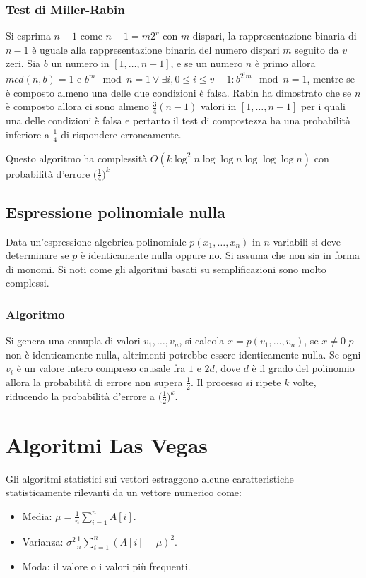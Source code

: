\subsubsection{Test di Miller-Rabin}
Si esprima $n-1$ come $n-1 = m2^v$ con $m$ dispari, la rappresentazione binaria di $n-1$ \`e uguale alla rappresentazione binaria del numero dispari $m$ seguito da $v$ zeri. Sia $b$
un numero in $[1, \dots, n - 1]$, e se un numero $n$ \`e primo allora $mcd(n, b) = 1$ e $b^m\mod n = 1\lor \exists i, 0\le i \le v -1: b^{2^im}\mod n = 1$, mentre se \`e composto almeno
una delle due condizioni \`e falsa. Rabin ha dimostrato che se $n$ \`e composto allora ci sono almeno $\frac{3}{4}(n - 1)$ valori in $[1, \dots, n - 1]$ per i quali una delle condizioni
\`e falsa e pertanto il test di compostezza ha una probabilit\`a inferiore a $\frac{1}{4}$ di rispondere erroneamente. 

Questo algoritmo ha complessit\`a $O(k\log^2 n\log\log n\log\log\log n)$ con probabilit\`a d'errore $\bigl(\frac{1}{4}\bigr)^k$
\subsection{Espressione polinomiale nulla}
Data un'espressione algebrica polinomiale $p(x_1, \dots, x_n)$ in $n$ variabili si deve determinare se $p$ \`e identicamente nulla oppure no. Si assuma che non sia in forma di monomi. Si
noti come gli algoritmi basati su semplificazioni sono molto complessi. 
\subsubsection{Algoritmo}
Si genera una ennupla di valori $v_1, \dots, v_n$, si calcola $x = p(v_1, \dots, v_n)$, se $x\neq 0$ $p$ non \`e identicamente nulla, altrimenti potrebbe essere identicamente nulla. Se 
ogni $v_i$ \`e un valore intero compreso causale fra $1$ e $2d$, dove $d$ \`e il grado del polinomio allora la probabilit\`a di errore non supera $\frac{1}{2}$. Il processo si ripete
$k$ volte, riducendo la probabilit\`a d'errore a $\bigl(\frac{1}{2}\bigr)^k$.
\section{Algoritmi Las Vegas}
Gli algoritmi statistici sui vettori estraggono alcune caratteristiche statisticamente rilevanti da un vettore numerico come:
\begin{itemize}
	\item Media: $\mu = \frac{1}{n}\sum\limits_{i = 1}^n A[i]$.
	\item Varianza: $\sigma^2 \frac{1}{n}\sum\limits_{i = 1}^n(A[i] - \mu)^2$.
	\item Moda: il valore o i valori pi\`u frequenti. 
\end{itemize}
